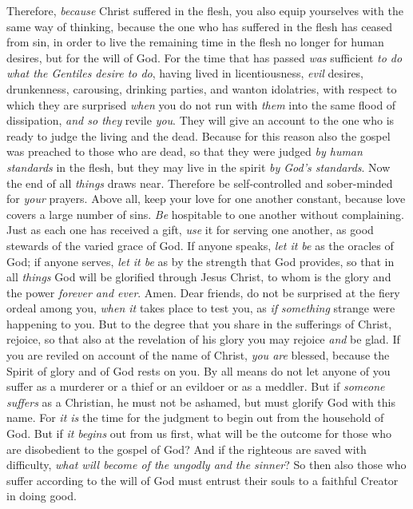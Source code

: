 \begin{biblechapter} %
 Therefore, \textit{because} Christ suffered in the flesh, you also equip yourselves with the same way of thinking, because the one who has suffered in the flesh has ceased from sin,
\verse in order to live the remaining time in the flesh no longer for human desires, but for the will of God.
\verse For the time that has passed \textit{was} sufficient \textit{to do what the Gentiles desire to do}, having lived in licentiousness, \textit{evil} desires, drunkenness, carousing, drinking parties, and wanton idolatries,
\verse with respect to which they are surprised \textit{when} you do not run with \textit{them} into the same flood of dissipation, \textit{and so they} revile \textit{you}.
\verse They will give an account to the one who is ready to judge the living and the dead.
\verse Because for this reason also the gospel was preached to those who are dead, so that they were judged \textit{by human standards} in the flesh, but they may live in the spirit \textit{by God’s standards}.
 Now the end of all \textit{things} draws near. Therefore be self-controlled and sober-minded for \textit{your} prayers.
\verse Above all, keep your love for one another constant, because love covers a large number of sins.
\verse \textit{Be} hospitable to one another without complaining.
\verse Just as each one has received a gift, \textit{use} it for serving one another, as good stewards of the varied grace of God.
\verse If anyone speaks, \textit{let it be} as the oracles of God; if anyone serves, \textit{let it be} as by the strength that God provides, so that in all \textit{things} God will be glorified through Jesus Christ, to whom is the glory and the power \textit{forever and ever}. Amen.
 Dear friends, do not be surprised at the fiery ordeal among you, \textit{when it} takes place to test you, as \textit{if} \textit{something} strange were happening to you.
\verse But to the degree that you share in the sufferings of Christ, rejoice, so that also at the revelation of his glory you may rejoice \textit{and} be glad.
\verse If you are reviled on account of the name of Christ, \textit{you are} blessed, because the Spirit of glory and of God rests on you.
\verse By all means do not let anyone of you suffer as a murderer or a thief or an evildoer or as a meddler.
\verse But if \textit{someone suffers} as a Christian, he must not be ashamed, but must glorify God with this name.
\verse For \textit{it is} the time for the judgment to begin out from the household of God. But if \textit{it begins} out from us first, what will be the outcome for those who are disobedient to the gospel of God?
\verse And if the righteous are saved with difficulty, \textit{what will become of the ungodly and the sinner}?
\verse So then also those who suffer according to the will of God must entrust their souls to a faithful Creator in doing good.
\end{biblechapter}

